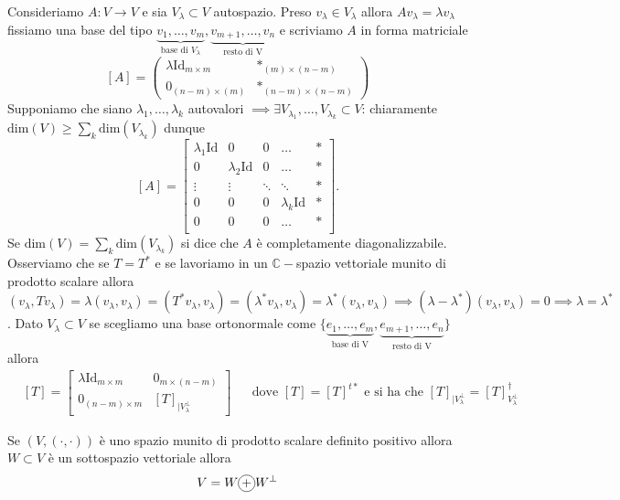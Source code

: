\documentclass[12pt, twoside, italian, openany]{book}
\begin{document}
	Consideriamo $A: V \to V$ e sia $V_\lambda \subset V$ autospazio. Preso $v_\lambda \in V_\lambda$ allora  $Av_\lambda = \lambda v_\lambda$ fissiamo una base del tipo ${\underbrace{v_1, \ldots, v_m}_\text{base di $V_\lambda$}, \underbrace{v_{m+1}, \ldots, v_n}_\text{resto di V}}$ e scriviamo $A$ in forma matriciale
	$$
		[A] = \begin{pmatrix}
			\lambda \text{Id}_{m \times m} & \ast_{(m) \times (n-m)}\\
			0_{(n-m) \times (m)} & \ast_{(n-m) \times (n-m)}
		\end{pmatrix}
	$$
	Supponiamo che siano $\lambda_1, \ldots, \lambda_k$ autovalori $\implies \exists V_{\lambda_1}, \ldots, V_{\lambda_k} \subset V$: chiaramente $\text{dim}(V) \geq \sum\limits_k \text{dim}(V_{\lambda_k})$ dunque
	$$
	[A] = \begin{bmatrix}
		\lambda_1 \text{Id} & 0 & 0 & \ldots & \ast \\
		0 & \lambda_2 \text{Id} & 0 & \ldots & \ast \\
		\vdots & 	\vdots		&		\ddots & \ddots & \ast \\
		0 & 0 &		0 & \lambda_k \text{Id} & \ast \\
		0 & 0 & 	0 	& \ldots & \ast\\
	\end{bmatrix}.
	$$
	Se $\text{dim}(V) = \sum\limits_k \text{dim}(V_{\lambda_k})$ si dice che $A$ è completamente diagonalizzabile. Osserviamo che se $T = T^*$ e se lavoriamo in un $\mathbb{C}-$spazio vettoriale munito di prodotto scalare allora $(v_\lambda, Tv_\lambda) = \lambda (v_\lambda, v_\lambda) = (T^* v_\lambda, v_\lambda) = (\lambda^* v_\lambda, v_\lambda) = \lambda^* (v_\lambda, v_\lambda) \implies (\lambda - \lambda^*) (v_\lambda, v_\lambda) = 0 \implies \lambda = \lambda^*$.
	Dato $V_\lambda \subset V$ se scegliamo una base ortonormale come $\{ \underbrace{e_1, \ldots, e_m}_\text{base di V}, \underbrace{e_{m+1}, \ldots, e_n}_\text{resto di V} \}$ allora
	\begin{align*}
	&[T] = \begin{bmatrix}
		\lambda \text{Id}_{m \times m} & 0_{m \times (n - m)} \\
		0_{(n-m) \times m} & [T]_{|V_\lambda^\perp}
	\end{bmatrix} & &\text{dove } [T] = [T]^{t \ast} \text{ e si ha che } [T]_{|V_\lambda^\perp} = [T]_{V_\lambda^\perp}^{\dag}
	\end{align*}
	\begin{prop}
		Se $(V, (\cdot, \cdot))$ è uno spazio munito di prodotto scalare definito positivo allora $W \subset V$ è un sottospazio vettoriale allora
		$$
			V = W \circled{+} W^\perp
		$$
	\end{prop}
\end{document}
